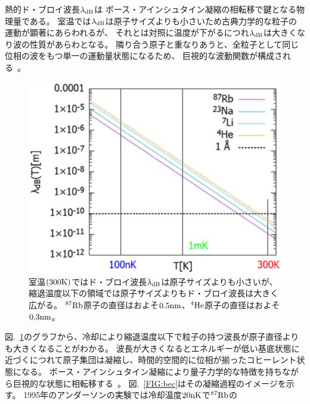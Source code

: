 \documentclass[12pt,a4paper]{jbook}
\begin{document}
        熱的ド・ブロイ波長$\lambda_{{\rm dB}}$は
        ボース・アインシュタイン凝縮の相転移で鍵となる物理量である。
        室温では$\lambda_{{\rm dB}}$は原子サイズよりも小さいため古典力学的な粒子の運動が顕著にあらわれるが、
        それとは対照に温度が下がるにつれ$\lambda_{{\rm dB}}$は大きくなり波の性質があらわとなる。
        隣り合う原子と重なりあうと、全粒子として同じ位相の波をもつ単一の運動量状態になるため、
        巨視的な波動関数が構成される~\cite{Pethick}。
		\begin{figure}[H]
			\begin{center}
				\includegraphics[width=14cm]{tlambda.eps}
				\caption{
					室温$(300{\rm K})$ではド・ブロイ波長$\lambda_{{\rm dB}}$は原子サイズよりも小さいが、
					縮退温度以下の領域では原子サイズよりもド・ブロイ波長は大きく広がる。
                    $^{87}{\rm Rb}$原子の直径はおよそ$0.5{\rm nm}$、$^{4}{\rm He}$原子の直径はおよそ$0.3{\rm nm}$。
				}
				\label{FIG:tlambda}
			\end{center}
		\end{figure}
		図.~\ref{FIG:tlambda}のグラフから、冷却により縮退温度以下で粒子の持つ波長が原子直径よりも大きくなることがわかる。
        波長が大きくなるとエネルギーが低い基底状態に近づくにつれて原子集団は凝縮し、時間的空間的に位相が揃ったコヒーレント状態になる。
		ボース・アインシュタイン凝縮により量子力学的な特徴を持ちながら巨視的な状態に相転移する~\cite{Durfee}。
        図.~\ref{FIG:bec}はその凝縮過程のイメージを示す。
		1995年のアンダーソンの実験では冷却温度$20{\rm nK}$で$^{87}{\rm Rb}$の
\end{document}
